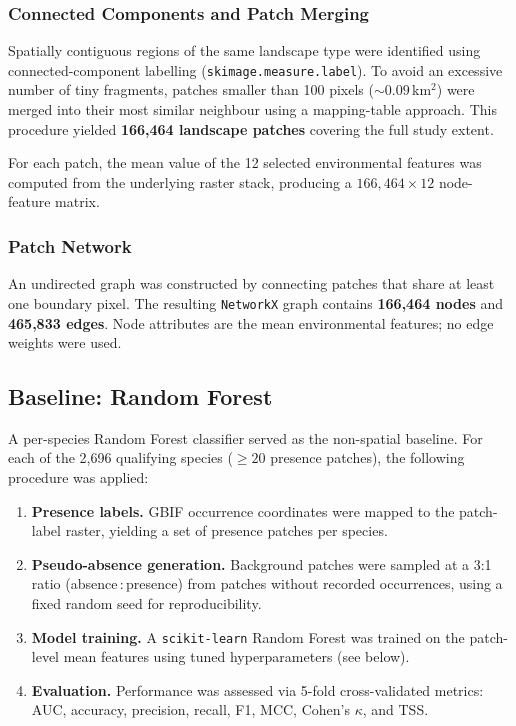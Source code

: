 \subsubsection{Connected Components and Patch Merging}
\label{sec:components}

Spatially contiguous regions of the same landscape type were identified using 
connected-component labelling (\texttt{skimage.measure.label}). To avoid an 
excessive number of tiny fragments, patches smaller than 100 pixels 
(${\sim}0.09$\,km$^2$) were merged into their most similar neighbour using a 
mapping-table approach. This procedure yielded \textbf{166,464 landscape patches} 
covering the full study extent.

For each patch, the mean value of the 12 selected environmental features was 
computed from the underlying raster stack, producing a $166{,}464 \times 12$ 
node-feature matrix.

\subsubsection{Patch Network}
\label{sec:network}

An undirected graph was constructed by connecting patches that share at least 
one boundary pixel. The resulting \texttt{NetworkX} graph contains 
\textbf{166,464 nodes} and \textbf{465,833 edges}. Node attributes are the mean 
environmental features; no edge weights were used.

\subsection{Baseline: Random Forest}
\label{sec:rf}

A per-species Random Forest \citep{Breiman2001} classifier served
as the non-spatial baseline. For each of the 2,696 qualifying
species ($\geq 20$ presence patches), the following procedure was
applied:

\begin{enumerate}
    \item \textbf{Presence labels.} GBIF occurrence coordinates were mapped to 
    the patch-label raster, yielding a set of presence patches per species.
    \item \textbf{Pseudo-absence generation.} Background patches were sampled at 
    a 3:1 ratio (absence\,:\,presence) from patches without recorded occurrences, 
    using a fixed random seed for reproducibility.
    \item \textbf{Model training.} A \texttt{scikit-learn} Random Forest 
    was trained on the patch-level mean features using tuned hyperparameters 
    (see below).
    \item \textbf{Evaluation.} Performance was assessed via 5-fold cross-validated 
    metrics: AUC, accuracy, precision, recall, F1, MCC, Cohen's $\kappa$, and TSS.
\end{enumerate}

